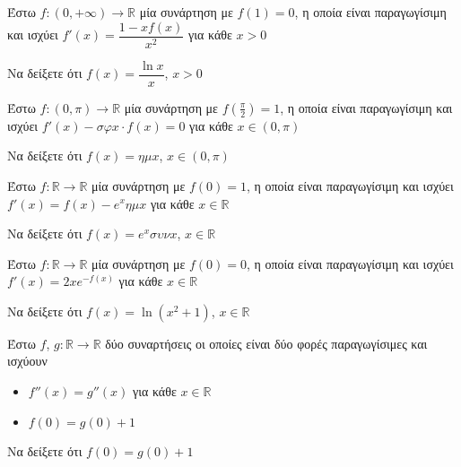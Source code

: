 \documentclass{presentation}
\begin{document}
\begin{askisi}
    Έστω $f:(0,+\infty)\to\mathbb{R}$ μία συνάρτηση με $f(1)=0$, η οποία είναι παραγωγίσιμη και ισχύει $f'(x)=\dfrac{1-xf(x)}{x^2}$ για κάθε $x>0$

    Να δείξετε ότι $f(x)=\dfrac{\ln x}{x}$, $x>0$

\end{askisi}

\begin{askisi}
    Έστω $f:(0,π)\to\mathbb{R}$ μία συνάρτηση με $f(\frac{π}{2})=1$, η οποία είναι παραγωγίσιμη και ισχύει $f'(x)-σφx\cdot f(x)=0$ για κάθε $x\in (0,π)$

    Να δείξετε ότι $f(x)=ημx$, $x\in (0,π)$

\end{askisi}

\begin{askisi}
    Έστω $f:\mathbb{R}\to\mathbb{R}$ μία συνάρτηση με $f(0)=1$, η οποία είναι παραγωγίσιμη και ισχύει $f'(x)=f(x)-e^xημx$ για κάθε $x\in\mathbb{R}$

    Να δείξετε ότι $f(x)=e^xσυνx$, $x\in\mathbb{R}$

\end{askisi}

\begin{askisi}
    Έστω $f:\mathbb{R}\to\mathbb{R}$ μία συνάρτηση με $f(0)=0$, η οποία είναι παραγωγίσιμη και ισχύει $f'(x)=2xe^{-f(x)}$ για κάθε $x\in\mathbb{R}$

    Να δείξετε ότι $f(x)=\ln (x^2+1)$, $x\in\mathbb{R}$

\end{askisi}

\begin{askisi}
    Έστω $f$, $g:\mathbb{R}\to\mathbb{R}$ δύο συναρτήσεις οι οποίες είναι δύο φορές παραγωγίσιμες και ισχύουν
    \begin{itemize}
        \item $f''(x)=g''(x)$ για κάθε $x\in\mathbb{R}$
        \item $f(0)=g(0)+1$
    \end{itemize}

    Να δείξετε ότι $f(0)=g(0)+1$

\end{askisi}
\end{document}
